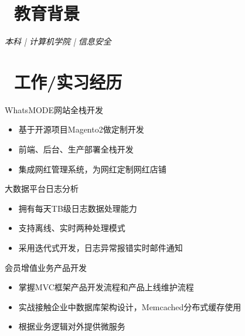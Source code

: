 \documentclass{resume}
\begin{document}


 
\section{\faGraduationCap\  教育背景}
\textit{本科 | 计算机学院 | 信息安全}

\section{\faUsers\ 工作/实习经历}
\role{后台开发工程师}{全职}
\begin{onehalfspacing}
WhatsMODE网站全栈开发
\begin{itemize}
  \item 基于开源项目Magento2做定制开发
  \item 前端、后台、生产部署全栈开发
  \item 集成网红管理系统，为网红定制网红店铺
\end{itemize}
\end{onehalfspacing}

\begin{onehalfspacing}
大数据平台日志分析
\begin{itemize}
  \item 拥有每天TB级日志数据处理能力
  \item 支持离线、实时两种处理模式
  \item 采用迭代式开发，日志异常报错实时邮件通知
\end{itemize}
\end{onehalfspacing}

\begin{onehalfspacing}
会员增值业务产品开发
\begin{itemize}
  \item 掌握MVC框架产品开发流程和产品上线维护流程
  \item 实战接触企业中数据库架构设计，Memcached分布式缓存使用
  \item 根据业务逻辑对外提供微服务
\end{itemize}
\end{onehalfspacing}
\end{document}

